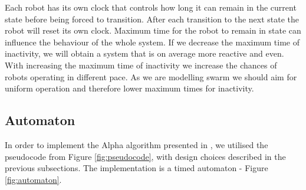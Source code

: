 Each robot has its own clock that controls how long it can remain in the current state before being forced to transition. After each transition to the next state the robot will reset its own clock. Maximum time for the robot to remain in state can influence the behaviour of the whole system. If we decrease the maximum time of inactivity, we will obtain a system that is on average more reactive and even. With increasing the maximum time of inactivity we increase the chances of robots operating in different pace. As we are modelling swarm we should aim for uniform operation and therefore lower maximum times for inactivity.

\subsection{Automaton}
In order to implement the Alpha algorithm presented in \cite{Minimalist_Coherent_Swarming_of_Wireless_Networked_Autonomous_Mobile_Robots}, we utilised the pseudocode from Figure \ref{fig:pseudocode}, with design choices described in the previous subsections. The implementation is a timed automaton - Figure \ref{fig:automaton}.


